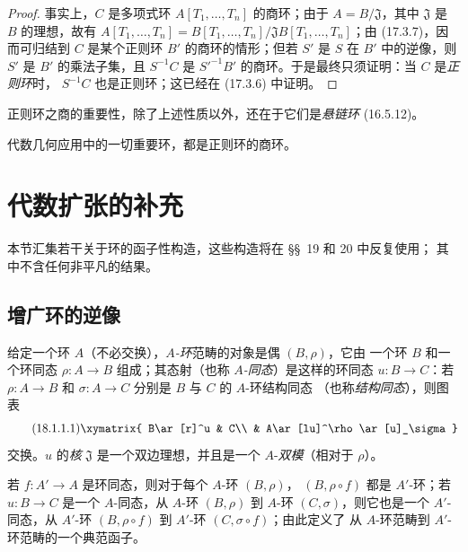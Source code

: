 \begin{proof}
事实上，$C$ 是多项式环 $A[T_1,\ldots,T_n]$ 的商环；由于
$A=B/\mathfrak{J}$，其中 $\mathfrak{J}$ 是 $B$ 的理想，故有
$A[T_1,\ldots,T_n]=B[T_1,\ldots,T_n]/\mathfrak{J}B[T_1,\ldots,T_n]$；由
(17.3.7)，因而可归结到 $C$ 是某个正则环 $B'$ 的商环的情形；但若 $S'$ 是
$S$ 在 $B'$ 中的逆像，则 $S'$ 是 $B'$ 的乘法子集，且 $S^{-1}C$ 是
$S'^{-1}B'$ 的商环。于是最终只须证明：当 $C$ 是\emph{正则环}时，
$S^{-1}C$ 也是正则环；这已经在 (17.3.6) 中证明。
\end{proof}

正则环之商的重要性，除了上述性质以外，还在于它们是\emph{悬链环}
(16.5.12)。

代数几何应用中的一切重要环，都是正则环的商环。

\section{代数扩张的补充}
\label{section:0.18-fr}

本节汇集若干关于环的函子性构造，这些构造将在 \S\S~19 和 20 中反复使用；
其中不含任何非平凡的结果。

\subsection{增广环的逆像}
\label{subsection:0.18.1-fr}

\begin{env}[18.1.1]
\label{0.18.1.1-fr}
给定一个环 $A$（不必交换），\emph{$A$-环}范畴的对象是偶 $(B,\rho)$，它由
一个环 $B$ 和一个环同态 $\rho:A\to B$ 组成；其态射（也称
\emph{$A$-同态}）是这样的环同态 $u:B\to C$：若
$\rho:A\to B$ 和 $\sigma:A\to C$ 分别是 $B$ 与 $C$ 的 $A$-环结构同态
（也称\emph{结构同态}），则图表
\begin{equation}
\label{0.18.1.1.1-fr}
\tag{18.1.1.1}
  \xymatrix{
    B\ar[r]^u & C\\
    & A\ar[lu]^\rho\ar[u]_\sigma
  }
\end{equation}
交换。$u$ 的\emph{核} $\mathfrak{J}$ 是一个双边理想，并且是一个
$A$-\emph{双模}（相对于 $\rho$）。

若 $f:A'\to A$ 是环同态，则对于每个 $A$-环 $(B,\rho)$，
$(B,\rho\circ f)$ 都是 $A'$-环；若 $u:B\to C$ 是一个 $A$-同态，从
$A$-环 $(B,\rho)$
到 $A$-环 $(C,\sigma)$，则它也是一个 $A'$-同态，从 $A'$-环
$(B,\rho\circ f)$ 到 $A'$-环 $(C,\sigma\circ f)$；由此定义了
从 $A$-环范畴到 $A'$-环范畴的一个典范函子。
\end{env}


